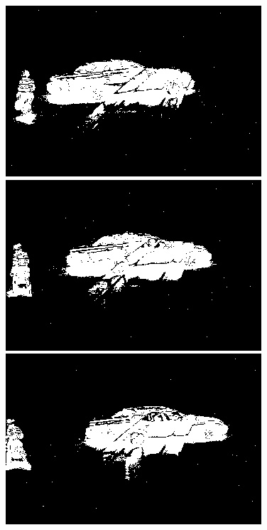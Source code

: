 \documentclass[a4paper]{ctexart}
\begin{document}
\begin{figure}[htbp]
\begin{minipage}[t]{0.2\textwidth}
	\end{minipage}
	\begin{minipage}[t]{0.2\textwidth}
		\centering
		\includegraphics[width=\textwidth]{figure/frames/single_gN20T01405.jpg}
	\end{minipage}
	\begin{minipage}[t]{0.2\textwidth}
		\centering
		\includegraphics[width=\textwidth]{figure/frames/single_gN20T01410.jpg}
	\end{minipage}
	\begin{minipage}[t]{0.2\textwidth}
		\centering
		\includegraphics[width=\textwidth]{figure/frames/single_gN20T01415.jpg}

\end{minipage}
\end{figure}
\end{document}
